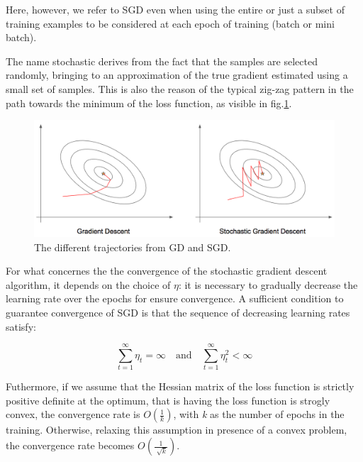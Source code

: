 		Here, however, we refer to SGD even when using the entire or just a subset of training examples to be considered at each epoch of training (batch or mini batch).

		The name stochastic derives from the fact that the samples are selected randomly, bringing to an approximation of the true gradient estimated using a small set of samples. This is also the reason of the typical zig-zag pattern in the path towards the minimum of the loss function, as visible in fig.\ref{fig:gradient}.
		\begin{figure}
			\centering
		    \includegraphics[width=.8\linewidth, scale=0.7]{img/figures/gradient.png}
			\caption{The different trajectories from GD and SGD.}
			\label{fig:gradient}
		\end{figure}
		
		For what concernes the the convergence of the stochastic gradient descent algorithm, it depends on the choice of $\eta$: it is necessary to gradually decrease the learning rate over the epochs for ensure convergence.
		A sufficient condition to guarantee convergence of SGD is that the sequence of decreasing learning rates satisfy:

		\begin{equation}
			\label{delta}
			\sum_{t=1}^\infty \eta_t = \infty \text{  } \text{ and }\text{  } \sum_{t=1}^\infty \eta_t^2 < \infty 
		\end{equation}

		Futhermore, if we assume that the Hessian matrix of the loss function is strictly positive definite at the optimum, that is having the loss function is strogly convex, the convergence rate is $O(\frac{1}{k})$, with \textit{k} as the number of epochs in the training. %
		Otherwise, relaxing this assumption in presence of a convex problem, the convergence rate becomes $O(\frac{1}{\sqrt[]{k}})$\cite{Goodfellow-et-al-2016}.%

